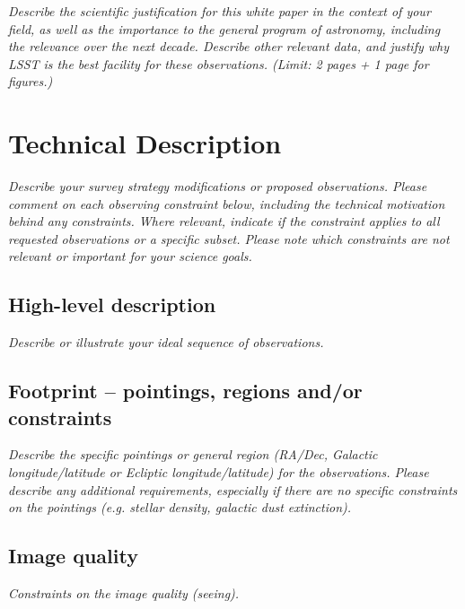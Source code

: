 \documentclass[11pt]{article}
\begin{document}
\begin{footnotesize}
{\it Describe the scientific justification for this white paper in the context
of your field, as well as the importance to the general program of astronomy, 
including the relevance over the next decade. 
Describe other relevant data, and justify why LSST is the best facility for these observations.
(Limit: 2 pages + 1 page for figures.)}
\end{footnotesize}

\vspace{.6in}

\section{Technical Description}
\begin{footnotesize}
{\it Describe your survey strategy modifications or proposed observations. Please comment on each observing constraint
below, including the technical motivation behind any constraints. Where relevant, indicate
if the constraint applies to all requested observations or a specific subset. Please note which 
constraints are not relevant or important for your science goals.}
\end{footnotesize}

\subsection{High-level description}
\begin{footnotesize}
{\it Describe or illustrate your ideal sequence of observations.}
\end{footnotesize}

\vspace{.3in}

\subsection{Footprint -- pointings, regions and/or constraints}
\begin{footnotesize}{\it Describe the specific pointings or general region (RA/Dec, Galactic longitude/latitude or 
Ecliptic longitude/latitude) for the observations. Please describe any additional requirements, especially if there
are no specific constraints on the pointings (e.g. stellar density, galactic dust extinction).}
\end{footnotesize}

\subsection{Image quality}
\begin{footnotesize}{\it Constraints on the image quality (seeing).}\end{footnotesize}
\end{document}
